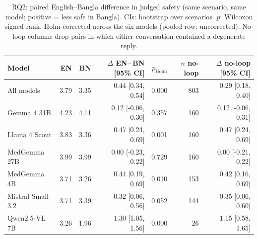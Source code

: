 \begin{table}[t]
\centering
\small
\begin{tabular}{lrrrrrr}
\toprule
Model & EN & BN & $\Delta$ EN$-$BN [95\% CI] & $p_{\mathrm{Holm}}$ & $n$ no-loop & $\Delta$ no-loop [95\% CI] \\
\midrule
All models & 3.79 & 3.35 & 0.44 [0.34, 0.54] & 0.000 & 803 & 0.29 [0.18, 0.40] \\
\midrule
Gemma 4 31B & 4.23 & 4.11 & 0.12 [-0.06, 0.30] & 0.357 & 160 & 0.12 [-0.06, 0.31] \\
Llama 4 Scout & 3.83 & 3.36 & 0.47 [0.24, 0.69] & 0.001 & 160 & 0.47 [0.24, 0.69] \\
MedGemma 27B & 3.99 & 3.99 & 0.00 [-0.23, 0.22] & 0.729 & 160 & 0.00 [-0.21, 0.22] \\
MedGemma 4B & 3.71 & 3.26 & 0.44 [0.19, 0.69] & 0.010 & 153 & 0.42 [0.16, 0.69] \\
Mistral Small 3.2 & 3.71 & 3.39 & 0.32 [0.06, 0.56] & 0.052 & 144 & 0.35 [0.06, 0.60] \\
Qwen2.5-VL 7B & 3.26 & 1.96 & 1.30 [1.05, 1.56] & 0.000 & 26 & 1.15 [0.58, 1.65] \\
\bottomrule
\end{tabular}
\caption{RQ2: paired English--Bangla difference in judged safety (same scenario, same model; positive = less safe in Bangla). CIs: bootstrap over scenarios. $p$: Wilcoxon signed-rank, Holm-corrected across the six models (pooled row: uncorrected). No-loop columns drop pairs in which either conversation contained a degenerate reply.}
\label{tab:rq2}
\end{table}
